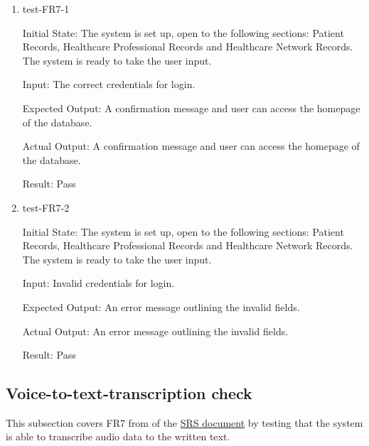 \documentclass[12pt, titlepage]{article}
\begin{document}
\begin{enumerate}

  \item{test-FR7-1} \label{test-FR7-1}
  
  Initial State: The system is set up, open to the following sections: Patient Records, Healthcare Professional Records and Healthcare Network Records. The system is ready to take the user input.

  Input: The correct credentials for login.

  Expected Output: A confirmation message and user can access the homepage of the database.

  Actual Output: A confirmation message and user can access the homepage of the database.

  Result: Pass


  \item{test-FR7-2} \label{test-FR7-2}

  Initial State: The system is set up, open to the following sections: Patient Records, Healthcare Professional Records and Healthcare Network Records. The system is ready to take the user input.

  Input: Invalid credentials for login.

  Expected Output: An error message outlining the invalid fields.

  Actual Output: An error message outlining the invalid fields.

  Result: Pass

\end{enumerate}

\subsection{Voice-to-text-transcription check} \label{section:3.5}

This subsection covers FR7 from of the \href{https://github.com/Inreet-Kaur/capstone/blob/main/docs/SRS/SRS.pdf} {SRS document} by testing that the system is able to transcribe audio data to the written text.
\end{document}
